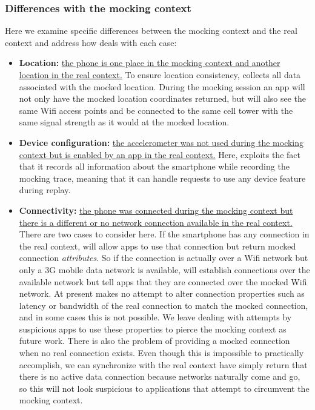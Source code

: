 \subsubsection{Differences with the mocking context}

Here we examine specific differences between the mocking context and the real
context and address how \PocketMocker{} deals with each case:

\begin{itemize}

\item \textbf{Location:} \uline{the phone is one place in the mocking context
and another location in the real context.} To ensure location consistency,
\PocketMocker{} collects all data associated with the mocked location. During
the mocking session an app will not only have the mocked location coordinates
returned, but will also see the same Wifi access points and be connected to
the same cell tower with the same signal strength as it would at the mocked
location.

\item \textbf{Device configuration:} \uline{the accelerometer was not used
during the mocking context but is enabled by an app in the real context.}
Here, \PocketMocker{} exploits the fact that it records all information about
the smartphone while recording the mocking trace, meaning that it can handle
requests to use any device feature during replay.

\item \textbf{Connectivity:} \uline{the phone was connected during the
mocking context but there is a different or no network connection available
in the real context.} There are two cases to consider here. If the smartphone
has any connection in the real context, \PocketMocker{} will allow apps to
use that connection but return mocked connection \textit{attributes}. So if
the connection is actually over a Wifi network but only a 3G mobile data
network is available, \PocketMocker{} will establish connections over the
available network but tell apps that they are connected over the mocked Wifi
network. At present \PocketMocker{} makes no attempt to alter connection
properties such as latency or bandwidth of the real connection to match the
mocked connection, and in some cases this is not possible. We leave dealing
with attempts by suspicious apps to use these properties to pierce the mocking
context as future work. There is also the problem of providing a mocked
connection when no real connection exists. Even though this is impossible to
practically accomplish, we can synchronize with the real context have
\PocketMocker{} simply return that there is no active data connection because
networks naturally come and go, so this will not look suspicious to
applications that attempt to circumvent the mocking context.

\end{itemize}

